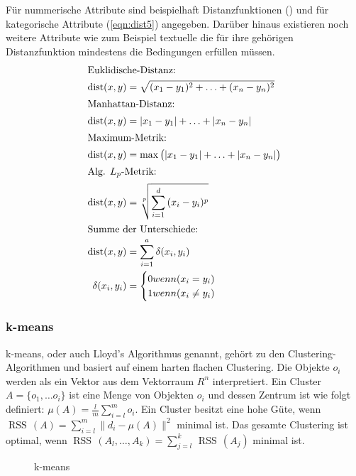 \documentclass[12pt,journal,compsoc,ngerman]{IEEEtran}
\DeclareMathOperator{\dist}{dist}
\DeclareMathOperator{\RSS}{RSS}
\begin{document}
Für nummerische Attribute sind beispielhaft Distanzfunktionen () und für 
kategorische Attribute (\cref{eqn:dist5}) angegeben. 
Darüber hinaus existieren noch weitere Attribute wie zum Beispiel 
textuelle die für ihre gehörigen Distanzfunktion mindestens die 
Bedingungen  erfüllen müssen.
{
\small
\setlength{\belowdisplayskip}{0pt}%
\setlength{\abovedisplayskip}{0pt}%
\begin{align}
\intertext{Euklidische-Distanz:} 
\dist(x,y) &= \sqrt{(x_1 - y_1)^2 + \ldots + (x_n - y_n)^2}\label{eqn:dist1}\\
\intertext{Manhattan-Distanz:}
\dist(x,y) &= |x_1 - y_1| + \ldots + |x_n - y_n|\label{eqn:dist2}\\
\intertext{Maximum-Metrik:} 
\dist(x,y) &= \max\big(|x_1 - y_1| + \ldots + |x_n - y_n|\big)\label{eqn:dist3}\\
\intertext{Alg. $L_p$-Metrik:}
\dist(x,y) &= \sqrt[p]{\sum\limits_{i=1}^{d}{(x_i-y_i)^p}}\label{eqn:dist4}\\
\intertext{Summe der Unterschiede:} 
 \dist(x,y) &= \sum\limits_{i=1}^{a}\delta(x_i, y_i)\label{eqn:dist5}\\
 \delta(x_i, y_i) &= \begin{cases}
 0 \mbox{ wenn } (x_i = y_i)\\
 1 \mbox{ wenn } (x_i \neq y_i)
 \end{cases} 
 \end{align} 
 }
\subsubsection{k-means} \label{sec:k-means}
 k-means, oder auch Lloyd's Algorithmus genannt, gehört zu den Clustering-Algorithmen und basiert auf 
einem harten flachen Clustering. Die Objekte $o_i$ werden als ein Vektor aus dem 
Vektorraum $R^n$ interpretiert. Ein Cluster $A = \{o_1, \ldots o_i\}$ ist eine Menge
von Objekten $o_i$ und dessen Zentrum ist wie folgt definiert: 
$\mu(A) = \frac{l}{m}\sum\limits_{i=l}^{m}o_i$. Ein Cluster besitzt eine hohe Güte, 
wenn $\RSS\,(A) = \sum\limits_{i=l}^{m}\big\|d_i - \mu(A)\big\|^2$ minimal ist. 
Das gesamte Clustering ist optimal, wenn $\RSS\,(A_l, \ldots, A_k) = \sum\limits_{j=l}^{k}\,\RSS\,(A_j)$ minimal ist. 

\begin{figure}[!t]
\centering
\subfigure[Phase 1 -- 3]{\scalebox{0.5}{}\label{fig:p1-3_k-means}}
\subfigure[Phase 4]{\scalebox{0.5}{}\label{fig:p4_k-means}}
\subfigure[Phase 5]{\scalebox{0.5}{}\label{fig:p5_k-means}}
\subfigure[Phase 6]{\scalebox{0.5}{}\label{fig:p6_k-means}}
\caption{k-means}
\label{fig:k-means}
\end{figure}
\end{document}
